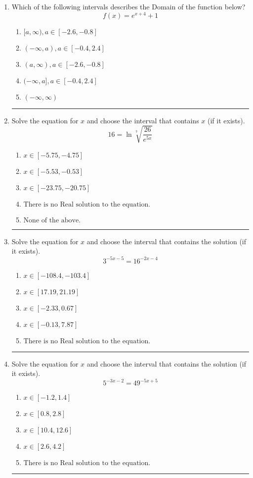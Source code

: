 \documentclass[14pt]{extbook}
\newcommand{\litem}[1]{\item#1\hspace*{-1cm}\rule{\textwidth}{0.4pt}}
\begin{document}
\begin{enumerate}
\litem{
Which of the following intervals describes the Domain of the function below?\[ f(x) = e^{x+4}+1 \]\begin{enumerate}[label=\Alph*.]
\item \( [a, \infty), a \in [-2.6, -0.8] \)
\item \( (-\infty, a), a \in [-0.4, 2.4] \)
\item \( (a, \infty), a \in [-2.6, -0.8] \)
\item \( (-\infty, a], a \in [-0.4, 2.4] \)
\item \( (-\infty, \infty) \)

\end{enumerate} }
\litem{
 Solve the equation for $x$ and choose the interval that contains $x$ (if it exists).\[  16 = \ln{\sqrt[7]{\frac{26}{e^{5x}}}} \]\begin{enumerate}[label=\Alph*.]
\item \( x \in [-5.75, -4.75] \)
\item \( x \in [-5.53, -0.53] \)
\item \( x \in [-23.75, -20.75] \)
\item \( \text{There is no Real solution to the equation.} \)
\item \( \text{None of the above.} \)

\end{enumerate} }
\litem{
Solve the equation for $x$ and choose the interval that contains the solution (if it exists).\[ 3^{-5x-5} = 16^{-2x-4} \]\begin{enumerate}[label=\Alph*.]
\item \( x \in [-108.4, -103.4] \)
\item \( x \in [17.19, 21.19] \)
\item \( x \in [-2.33, 0.67] \)
\item \( x \in [-0.13, 7.87] \)
\item \( \text{There is no Real solution to the equation.} \)

\end{enumerate} }
\litem{
Solve the equation for $x$ and choose the interval that contains the solution (if it exists).\[ 5^{-3x-2} = 49^{-5x+5} \]\begin{enumerate}[label=\Alph*.]
\item \( x \in [-1.2, 1.4] \)
\item \( x \in [0.8, 2.8] \)
\item \( x \in [10.4, 12.6] \)
\item \( x \in [2.6, 4.2] \)
\item \( \text{There is no Real solution to the equation.} \)


\end{enumerate}}
\end{enumerate}
\end{document}
